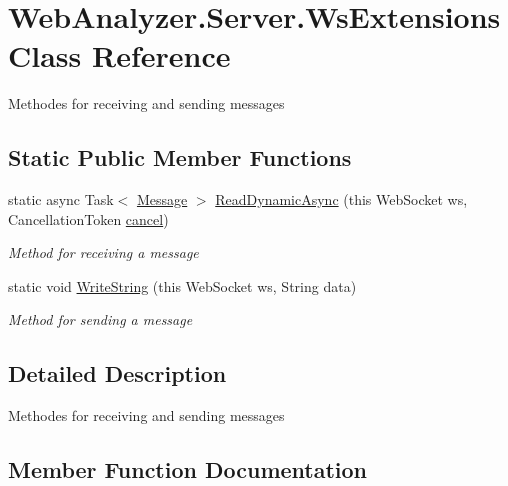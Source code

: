 \hypertarget{class_web_analyzer_1_1_server_1_1_ws_extensions}{}\section{Web\+Analyzer.\+Server.\+Ws\+Extensions Class Reference}
\label{class_web_analyzer_1_1_server_1_1_ws_extensions}


Methodes for receiving and sending messages  


\subsection*{Static Public Member Functions}
\begin{DoxyCompactItemize}
\item 
static async Task$<$ \hyperlink{class_web_analyzer_1_1_models_1_1_message_model_1_1_message}{Message} $>$ \hyperlink{class_web_analyzer_1_1_server_1_1_ws_extensions_a770900a0eaa564c76e90d5fe04443f7f}{Read\+Dynamic\+Async} (this Web\+Socket ws, Cancellation\+Token \hyperlink{_u_i_2_h_t_m_l_resources_2js_2src_2edit__rule_8js_a6bb6c6d36178f7806d97319e35438412}{cancel})
\begin{DoxyCompactList}\small\item\em Method for receiving a message \end{DoxyCompactList}\item 
static void \hyperlink{class_web_analyzer_1_1_server_1_1_ws_extensions_ad8b42dc8c1a11d59f820217e399351db}{Write\+String} (this Web\+Socket ws, String data)
\begin{DoxyCompactList}\small\item\em Method for sending a message \end{DoxyCompactList}\end{DoxyCompactItemize}


\subsection{Detailed Description}
Methodes for receiving and sending messages 



\subsection{Member Function Documentation}
\hypertarget{class_web_analyzer_1_1_server_1_1_ws_extensions_a770900a0eaa564c76e90d5fe04443f7f}{}
